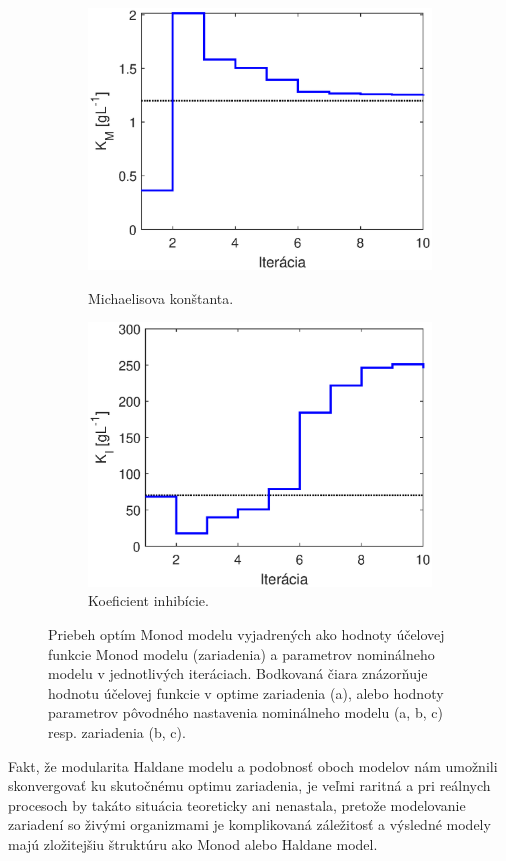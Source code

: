 \begin{figure}
	\bigskip

	\begin{subfigure}[b]{0.49\textwidth}
		\centering\
		\includegraphics[width=\linewidth]{images/TwoStep_Km}
		\caption{Michaelisova konštanta.}
		\label{fig:twostep_opt_Km}
	\end{subfigure}
	\begin{subfigure}[b]{0.49\textwidth}
		\centering
		\includegraphics[width=\linewidth]{images/TwoStep_Ki}
		\caption{Koeficient inhibície.}
		\label{fig:twostep_opt_Ki}
	\end{subfigure}
	\caption{Priebeh optím Monod modelu vyjadrených ako hodnoty účelovej funkcie Monod modelu (zariadenia) a parametrov nominálneho modelu v jednotlivých iteráciach. Bodkovaná čiara znázorňuje hodnotu účelovej funkcie v optime zariadenia (a), alebo hodnoty parametrov pôvodného nastavenia nominálneho modelu (a, b, c) resp. zariadenia (b, c).}
	\label{fig:twostep_opt}
\end{figure}

Fakt, že modularita Haldane modelu a podobnosť oboch modelov nám umožnili skonvergovať ku skutočnému optimu zariadenia, je veľmi raritná a pri reálnych procesoch by takáto situácia teoreticky ani nenastala, pretože modelovanie zariadení so živými organizmami je komplikovaná záležitosť a výsledné modely majú zložitejšiu štruktúru ako Monod alebo Haldane model. 
